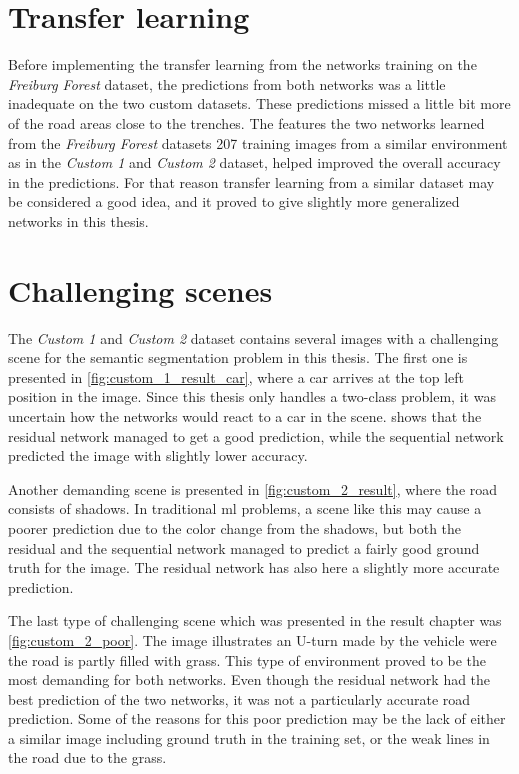 \documentclass[USenglish]{ifimaster}  %
\begin{document}
\section{Transfer learning}
Before implementing the transfer learning from the networks training on the \textit{Freiburg Forest} dataset, the predictions from both networks was a little inadequate on the two custom datasets. These predictions missed a little bit more of the road areas close to the trenches. The features the two networks learned from the \textit{Freiburg Forest} datasets 207 training images from a similar environment as in the \textit{Custom 1} and \textit{Custom 2} dataset, helped improved the overall accuracy in the predictions. For that reason transfer learning from a similar dataset may be considered a good idea, and it proved to give slightly more generalized networks in this thesis.  

\section{Challenging scenes}
The \textit{Custom 1} and \textit{Custom 2} dataset contains several images with a challenging scene for the semantic segmentation problem in this thesis. The first one is presented in \cref{fig:custom_1_result_car}, where a car arrives at the top left position in the image. Since this thesis only handles a two-class problem, it was uncertain how the networks would react to a car in the scene.  shows that the residual network managed to get a good prediction, while the sequential network predicted the image with slightly lower accuracy.

Another demanding scene is presented in \cref{fig:custom_2_result}, where the road consists of shadows. In traditional \ac{ml} problems, a scene like this may cause a poorer prediction due to the color change from the shadows, but both the residual and the sequential network managed to predict a fairly good ground truth for the image. The residual network has also here a slightly more accurate prediction.

The last type of challenging scene which was presented in the result chapter was \cref{fig:custom_2_poor}. The image illustrates an U-turn made by the vehicle were the road is partly filled with grass. This type of environment proved to be the most demanding for both networks. Even though the residual network had the best prediction of the two networks, it was not a particularly accurate road prediction. Some of the reasons for this poor prediction may be the lack of either a similar image including ground truth in the training set, or the weak lines in the road due to the grass. 
\end{document}
